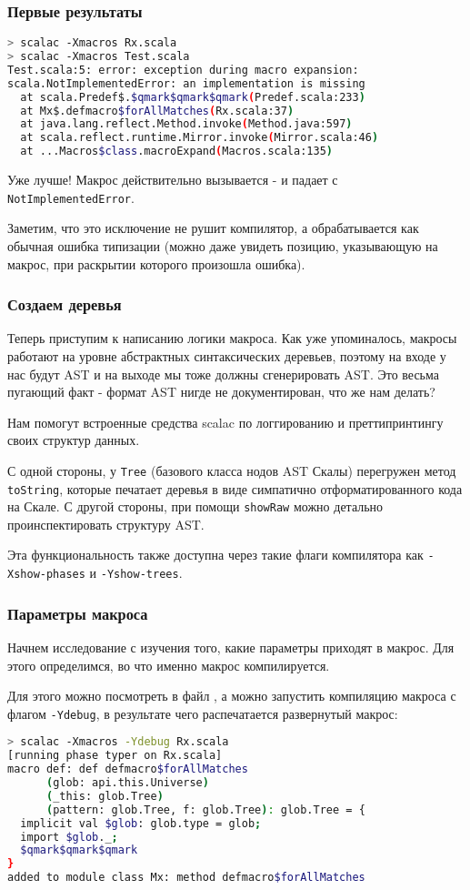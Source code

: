 \documentclass[hyperref={bookmarks=false}]{beamer}
\begin{document}
\begin{frame}[t,fragile]
\frametitle{Первые результаты}

\begin{lstlisting}[language=bash]
> scalac -Xmacros Rx.scala
> scalac -Xmacros Test.scala
Test.scala:5: error: exception during macro expansion:
scala.NotImplementedError: an implementation is missing
  at scala.Predef$.$qmark$qmark$qmark(Predef.scala:233)
  at Mx$.defmacro$forAllMatches(Rx.scala:37)
  at java.lang.reflect.Method.invoke(Method.java:597)
  at scala.reflect.runtime.Mirror.invoke(Mirror.scala:46)
  at ...Macros$class.macroExpand(Macros.scala:135)
\end{lstlisting}

Уже лучше! Макрос действительно вызывается - и падает с \texttt{NotImplementedError}.

Заметим, что это исключение не рушит компилятор, а обрабатывается как обычная ошибка типизации (можно даже увидеть позицию, указывающую на макрос, при раскрытии которого произошла ошибка).
\end{frame}

\begin{frame}[t,fragile]
\frametitle{Создаем деревья}
Теперь приступим к написанию логики макроса. Как уже упоминалось, макросы работают на уровне абстрактных синтаксических деревьев, поэтому на входе у нас будут AST и на выходе мы тоже должны сгенерировать AST. Это весьма пугающий факт - формат AST нигде не документирован, что же нам делать?

Нам помогут встроенные средства scalac по логгированию и преттипринтингу своих структур данных.

С одной стороны, у \texttt{Tree} (базового класса нодов AST Скалы) перегружен метод \texttt{toString}, которые печатает деревья в виде симпатично отформатированного кода на Скале. С другой стороны, при помощи \texttt{showRaw} можно детально проинспектировать структуру AST.

Эта функциональность также доступна через такие флаги компилятора как \texttt{-Xshow-phases} и \texttt{-Yshow-trees}.
\end{frame}

\begin{frame}[t,fragile]
\frametitle{Параметры макроса}

Начнем исследование с изучения того, какие параметры приходят в макрос. Для этого определимся, во что именно макрос компилируется.

Для этого можно посмотреть в файл , а можно запустить компиляцию макроса с флагом \texttt{-Ydebug}, в результате чего распечатается развернутый макрос:

\begin{lstlisting}[language=sh]
> scalac -Xmacros -Ydebug Rx.scala
[running phase typer on Rx.scala]
macro def: def defmacro$forAllMatches
      (glob: api.this.Universe)
      (_this: glob.Tree)
      (pattern: glob.Tree, f: glob.Tree): glob.Tree = {
  implicit val $glob: glob.type = glob;
  import $glob._;
  $qmark$qmark$qmark
}
added to module class Mx: method defmacro$forAllMatches
\end{lstlisting}
\end{frame}
\end{document}
